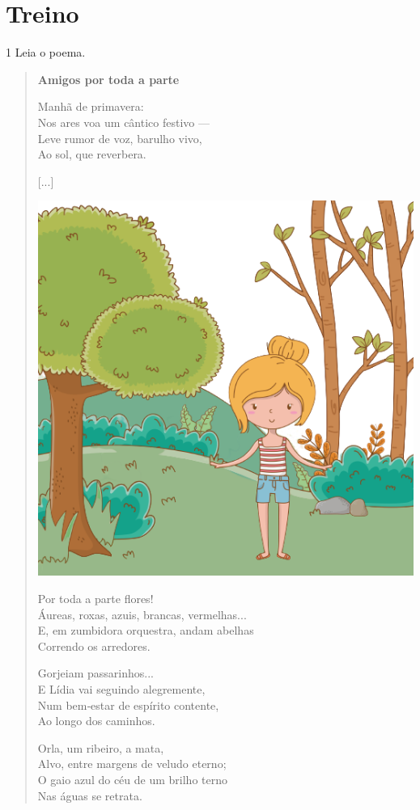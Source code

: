 \section*{Treino}

\num{1} Leia o poema.

\begin{myquote}
\begin{verse}
\textbf{Amigos por toda a parte}

Manhã de primavera:\\
Nos ares voa um cântico festivo ---\\
Leve rumor de voz, barulho vivo,\\
Ao sol, que reverbera.

{[}...{]}

\includegraphics[width=.8\textwidth]{./media/image17a.png}
\pagebreak

Por toda a parte flores!\\
Áureas, roxas, azuis, brancas, vermelhas...\\
E, em zumbidora orquestra, andam abelhas\\
Correndo os arredores.

Gorjeiam passarinhos...\\
E Lídia vai seguindo alegremente,\\
Num bem‑estar de espírito contente,\\
Ao longo dos caminhos.

Orla, um ribeiro, a mata,\\
Alvo, entre margens de veludo eterno;\\
O gaio azul do céu de um brilho terno\\
Nas águas se retrata.


\end{verse}
\end{myquote}
